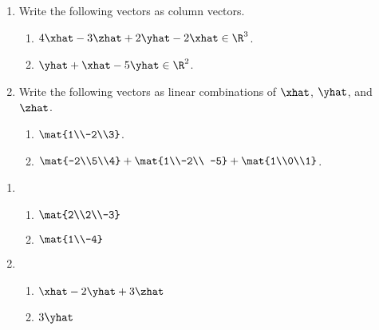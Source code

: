\begin{exercises}
	\begin{problist}
		\prob
		\begin{enumerate}
			\item
				Write the following vectors as column vectors.
				\begin{enumerate}
					\item $4\xhat -3\zhat +2\yhat -2\xhat\in\R^3$.
					\item $\yhat +\xhat -5\yhat \in\R^2$.
				\end{enumerate}
			\item
				Write the following vectors as linear combinations of $\xhat$, $\yhat$, and
				$\zhat$.
				\begin{enumerate}
					\item $\mat{1\\-2\\3}$.
					\item $\mat{-2\\5\\4} + \mat{1\\-2\\ -5} + \mat{1\\0\\1}$.
				\end{enumerate}
		\end{enumerate}
		\begin{solution}
		    \begin{enumerate}
		        \item 
		            \begin{enumerate}
		                \item $\mat{2\\2\\-3}$
		                \item $\mat{1\\-4}$
		            \end{enumerate}
		        \item
		            \begin{enumerate}
		                \item $\xhat - 2\yhat + 3\zhat$
		                \item $3\yhat$
		            \end{enumerate}
		    \end{enumerate}
		\end{solution}


\end{problist}
\end{exercises}
